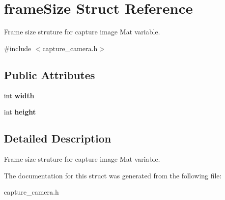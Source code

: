 \hypertarget{structframe_size}{}\section{frame\+Size Struct Reference}
\label{structframe_size}


Frame size struture for capture image Mat variable.  




{\ttfamily \#include $<$capture\+\_\+camera.\+h$>$}

\subsection*{Public Attributes}
\begin{DoxyCompactItemize}
\item 
\mbox{\label{structframe_size_ae1afe0dcc4b51154087094d5abc744b3}} 
int {\bfseries width}
\item 
\mbox{\label{structframe_size_a0b3454798db29aec2b205ae96c1a0fe7}} 
int {\bfseries height}
\end{DoxyCompactItemize}


\subsection{Detailed Description}
Frame size struture for capture image Mat variable. 

The documentation for this struct was generated from the following file\+:\begin{DoxyCompactItemize}
\item 
capture\+\_\+camera.\+h\end{DoxyCompactItemize}
